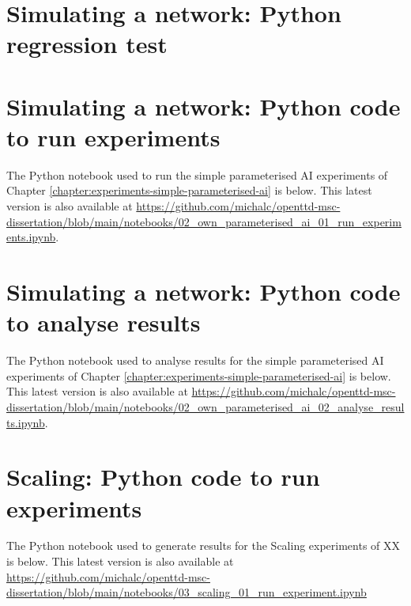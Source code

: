 \documentclass[logo,msc,dsti]{style/infthesis}    %
\begin{document}
{

\chapter{Simulating a network: Python regression test}
\label{chapter:simulating-a-network-python-regression-test}



\chapter{Simulating a network: Python code to run experiments}
\label{chapter:own-parameterised-ai-run-experiments}

The Python notebook used to run the simple parameterised AI experiments of Chapter \ref{chapter:experiments-simple-parameterised-ai} is below. This latest version is also available at \url{https://github.com/michalc/openttd-msc-dissertation/blob/main/notebooks/02_own_parameterised_ai_01_run_experiments.ipynb}.



\chapter{Simulating a network: Python code to analyse results}
\label{chapter:own-parameterised-ai-analyse-results}

The Python notebook used to analyse results for the simple parameterised AI experiments of Chapter \ref{chapter:experiments-simple-parameterised-ai} is below. This latest version is also available at \url{https://github.com/michalc/openttd-msc-dissertation/blob/main/notebooks/02_own_parameterised_ai_02_analyse_results.ipynb}.




\chapter{Scaling: Python code to run experiments}
\label{chapter:scaling-running-code}

The Python notebook used to generate results for the Scaling experiments of XX is below. This latest version is also available at \url{https://github.com/michalc/openttd-msc-dissertation/blob/main/notebooks/03_scaling_01_run_experiment.ipynb}

}
\end{document}
